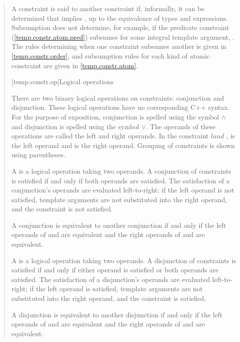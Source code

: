 \begin{quote}
\pnum
A constraint  is said to  another constraint  
if, informally, it can be determined that  implies , up to 
the equivalence of types and expressions. 
% 
\enternote
Subsumption does not determine, for example, if the predicate 
constraint (\ref{temp.constr.atom.pred}) 
 subsumes  for 
some integral template argument, . 
\exitnote
% 
The rules determining when one constraint subsumes another is given
in \ref{temp.constr.order}, and subsumption
rules for each kind of atomic constraint are given in
\ref{temp.constr.atom}.


[temp.constr.op]{Logical operations}

\pnum
There are two binary logical operations on constraints: conjunction
and disjunction.
% 
\enternote 
These logical operations have no corresponding C++ syntax.
For the purpose of exposition, conjunction is spelled
using the symbol $\land$ and disjunction is spelled using the 
symbol $\lor$. 
% 
The operands of these operations are called the left 
and right operands. In the constraint  $land$ ,
 is the left operand and  is the right operand.
% 
Grouping of constraints is shown using parentheses.
\exitnote

\pnum
A  is a logical operation taking two 
operands. A conjunction of constraints is satisfied if and only 
if both operands are satisfied. 
% 
The satisfaction of a conjunction's operands are evaluated left-to-right; 
if the left operand is not satisfied, template arguments are not 
substituted into the right operand, and the constraint is not satisfied.

\pnum
A conjunction  is equivalent to another conjunction 
if and only if the left operands of  and  are equivalent
and the right operands of  and  are equivalent.

\pnum
A  is a logical operation taking two 
operands. A disjunction of constraints is satisfied if and only 
if either operand is satisfied or both operands are satisfied.
% 
The satisfaction of a disjunction's operands are evaluated left-to-right; 
if the left operand is satisfied, template arguments are not 
substituted into the right operand, and the constraint is satisfied.

\pnum
A disjunction  is equivalent to another disjunction 
if and only if the left operands of  and  are equivalent
and the right operands of  and  are equivalent.



\end{quote}
